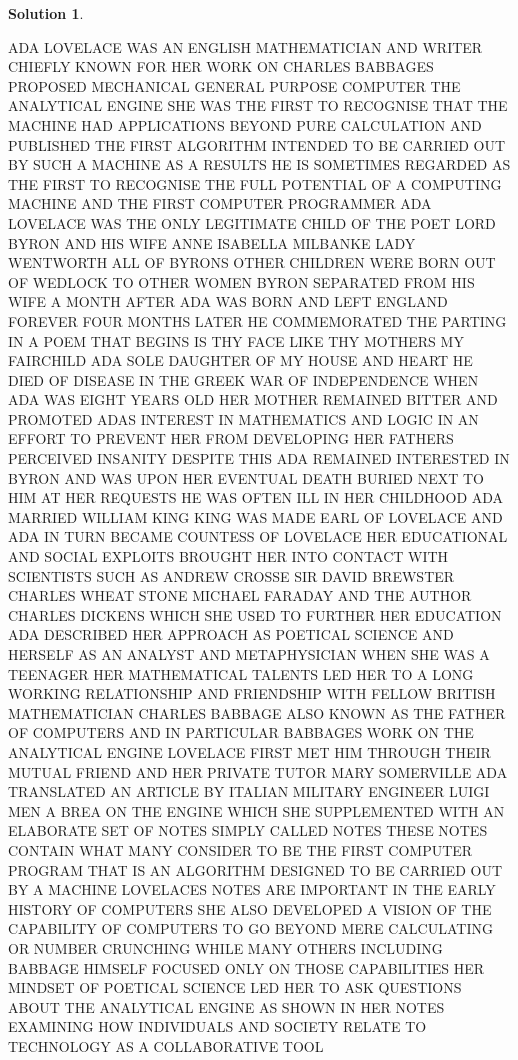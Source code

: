 \documentclass{article}
\theoremstyle{definition}
\newtheorem*{solution}{Solution}
\begin{document}
\begin{solution}\ \\
\begin{compactenum}
ADA LOVELACE WAS AN ENGLISH MATHEMATICIAN AND WRITER CHIEFLY KNOWN FOR HER WORK ON CHARLES BABBAGES PROPOSED MECHANICAL GENERAL PURPOSE COMPUTER THE ANALYTICAL ENGINE SHE WAS THE FIRST TO RECOGNISE THAT THE MACHINE HAD APPLICATIONS BEYOND PURE CALCULATION AND PUBLISHED THE FIRST ALGORITHM INTENDED TO BE CARRIED OUT BY SUCH A MACHINE AS A RESULTS HE IS SOMETIMES REGARDED AS THE FIRST TO RECOGNISE THE FULL POTENTIAL OF A COMPUTING MACHINE AND THE FIRST COMPUTER PROGRAMMER ADA LOVELACE WAS THE ONLY LEGITIMATE CHILD OF THE POET LORD BYRON AND HIS WIFE ANNE ISABELLA MILBANKE LADY WENTWORTH ALL OF BYRONS OTHER CHILDREN WERE BORN OUT OF WEDLOCK TO OTHER WOMEN BYRON SEPARATED FROM HIS WIFE A MONTH AFTER ADA WAS BORN AND LEFT ENGLAND FOREVER FOUR MONTHS LATER HE COMMEMORATED THE PARTING IN A POEM THAT BEGINS IS THY FACE LIKE THY MOTHERS MY FAIRCHILD ADA SOLE DAUGHTER OF MY HOUSE AND HEART HE DIED OF DISEASE IN THE GREEK WAR OF INDEPENDENCE WHEN ADA WAS EIGHT YEARS OLD HER MOTHER REMAINED BITTER AND PROMOTED ADAS INTEREST IN MATHEMATICS AND LOGIC IN AN EFFORT TO PREVENT HER FROM DEVELOPING HER FATHERS PERCEIVED INSANITY DESPITE THIS ADA REMAINED INTERESTED IN BYRON AND WAS UPON HER EVENTUAL DEATH BURIED NEXT TO HIM AT HER REQUESTS HE WAS OFTEN ILL IN HER CHILDHOOD ADA MARRIED WILLIAM KING KING WAS MADE EARL OF LOVELACE AND ADA IN TURN BECAME COUNTESS OF LOVELACE HER EDUCATIONAL AND SOCIAL EXPLOITS BROUGHT HER INTO CONTACT WITH SCIENTISTS SUCH AS ANDREW CROSSE SIR DAVID BREWSTER CHARLES WHEAT STONE MICHAEL FARADAY AND THE AUTHOR CHARLES DICKENS WHICH SHE USED TO FURTHER HER EDUCATION ADA DESCRIBED HER APPROACH AS POETICAL SCIENCE AND HERSELF AS AN ANALYST AND METAPHYSICIAN WHEN SHE WAS A TEENAGER HER MATHEMATICAL TALENTS LED HER TO A LONG WORKING RELATIONSHIP AND FRIENDSHIP WITH FELLOW BRITISH MATHEMATICIAN CHARLES BABBAGE ALSO KNOWN AS THE FATHER OF COMPUTERS AND IN PARTICULAR BABBAGES WORK ON THE ANALYTICAL ENGINE LOVELACE FIRST MET HIM THROUGH THEIR MUTUAL FRIEND AND HER PRIVATE TUTOR MARY SOMERVILLE ADA TRANSLATED AN ARTICLE BY ITALIAN MILITARY ENGINEER LUIGI MEN A BREA ON THE ENGINE WHICH SHE SUPPLEMENTED WITH AN ELABORATE SET OF NOTES SIMPLY CALLED NOTES THESE NOTES CONTAIN WHAT MANY CONSIDER TO BE THE FIRST COMPUTER PROGRAM THAT IS AN ALGORITHM DESIGNED TO BE CARRIED OUT BY A MACHINE LOVELACES NOTES ARE IMPORTANT IN THE EARLY HISTORY OF COMPUTERS SHE ALSO DEVELOPED A VISION OF THE CAPABILITY OF COMPUTERS TO GO BEYOND MERE CALCULATING OR NUMBER CRUNCHING WHILE MANY OTHERS INCLUDING BABBAGE HIMSELF FOCUSED ONLY ON THOSE CAPABILITIES HER MINDSET OF POETICAL SCIENCE LED HER TO ASK QUESTIONS ABOUT THE ANALYTICAL ENGINE AS SHOWN IN HER NOTES EXAMINING HOW INDIVIDUALS AND SOCIETY RELATE TO TECHNOLOGY AS A COLLABORATIVE TOOL
\end{compactenum}
\end{solution}
\end{document}
